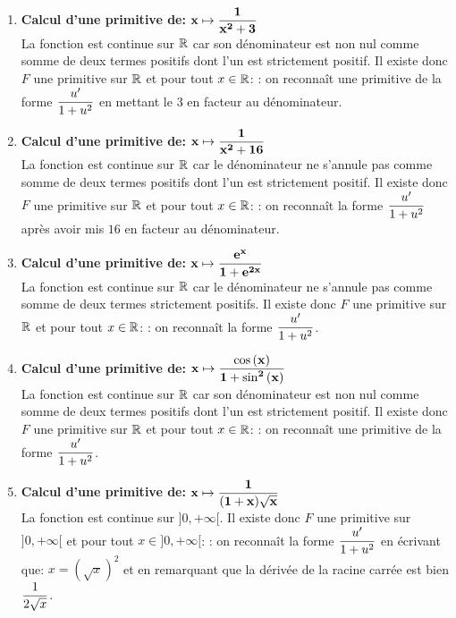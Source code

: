 \documentclass[a4paper, 11pt,reqno]{article}
\begin{document}
\begin{correction}  \;
	\begin{enumerate}
		\item \textbf{Calcul d'une primitive de: $\mathbf{x\mapsto \displaystyle\frac{1}{x^2+3}}$}\\
		      \noindent La fonction est continue sur $\mathbb{R}$ car son d\'enominateur est non nul comme somme de deux termes positifs dont l'un est strictement positif. Il existe donc $F$ une primitive sur $\mathbb{R}$ et pour tout $x\in\mathbb{R}$:  : on reconna\^{i}t une primitive de la forme $\displaystyle\frac{u^{\prime}}{1+u^2}$ en mettant le 3 en facteur au d\'enominateur.
		\item \textbf{Calcul d'une primitive de: $\mathbf{x\mapsto \displaystyle\frac{1}{x^2+16 }}$}\\
		      \noindent La fonction est continue sur $\mathbb{R}$ car le d\'enominateur ne s'annule pas comme somme de deux termes positifs dont l'un est strictement positif. Il existe donc $F$ une primitive sur $\mathbb{R}$ et pour tout $x\in\mathbb{R}$: : on reconna\^{i}t la forme $\displaystyle\frac{u^{\prime}}{1+u^2}$ apr\`{e}s avoir mis $16$ en facteur au d\'enominateur.
		\item \textbf{Calcul d'une primitive de: $\mathbf{ x\mapsto \displaystyle\frac{e^x}{ 1+e^{2x}}} $}\\
		      \noindent La fonction est continue sur $\mathbb{R}$ car le d\'enominateur ne s'annule pas comme somme de deux termes strictement positifs. Il existe donc $F$ une primitive sur $\mathbb{R}$ et pour tout $x\in\mathbb{R}$: : on reconna\^{i}t la forme $\displaystyle\frac{u^{\prime}}{1+u^2}$.
		\item \textbf{Calcul d'une primitive de: $\mathbf{x\mapsto \displaystyle\frac{\cos{(x)}}{ 1+\sin^2{(x)}} }$}\\
		      \noindent   La fonction est continue sur $\mathbb{R}$ car son d\'enominateur est non nul comme somme de deux termes positifs dont l'un est strictement positif. Il existe donc $F$ une primitive sur $\mathbb{R}$ et pour tout $x\in\mathbb{R}$: : on reconna\^{i}t une primitive de la forme $\displaystyle\frac{u^{\prime}}{1+u^2}$.
		\item \textbf{Calcul d'une primitive de: $\mathbf{x\mapsto \displaystyle\frac{ 1 }{ ( 1+x )\sqrt{x} } }$}\\
		      \noindent La fonction est continue sur $\rbrack 0,+\infty\lbrack$. Il existe donc $F$ une primitive sur $\rbrack 0,+\infty\lbrack$ et pour tout $x\in\rbrack 0,+\infty\lbrack$: : on reconna\^{i}t la forme $\displaystyle\frac{u^{\prime}}{1+u^2}$ en \'ecrivant que: $x=(\sqrt{x})^2$ et en remarquant que la d\'eriv\'ee de la racine carr\'ee est bien $\displaystyle\frac{1}{2\sqrt{x}}$.

\end{enumerate}
\end{correction}
\end{document}
